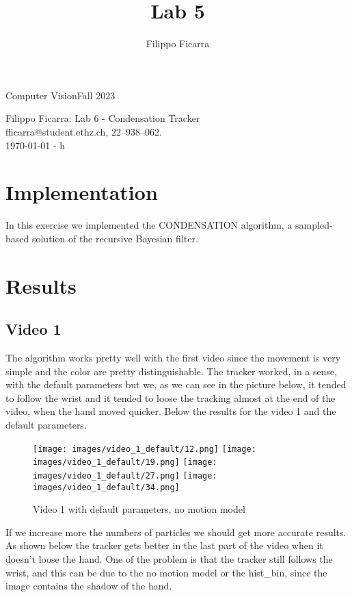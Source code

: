 \documentclass{ETHExercise}
\title{Lab 5}
\author{Filippo Ficarra}
\newcommand{\timestamp}{\ddmmyyyydate\today \,\,- \currenttime h}
\begin{document}
{}
{\Large Computer Vision}{Fall 2023}
\begin{center}
    {\Huge Filippo Ficarra: Lab 6 - Condensation Tracker}\\
      \quad\newline
      fficarra@student.ethz.ch, 22--938--062.\\
      \quad\newline
      \timestamp
      \end{center}



\section{Implementation}
In this exercise we implemented the CONDENSATION algorithm, a sampled-based solution of the recursive Bayesian filter.

\section{Results}

\subsection{Video 1}

The algorithm works pretty well with the first video since the movement 
is very simple and the color are pretty distinguishable. The tracker worked, in a sense, with the
default parameters but we, as we can see in the picture below, it tended to follow the wrist and it 
tended to loose the tracking almost at the end of the video, when the hand moved quicker.
Below the results for the video 1 and the default parameters.


\begin{figure}[!h]
    \texttt{[image: images/video\_1\_default/12.png]}
  \endminipage
    \texttt{[image: images/video\_1\_default/19.png]}
  \endminipage
    \texttt{[image: images/video\_1\_default/27.png]}
  \endminipage\space
    \texttt{[image: images/video\_1\_default/34.png]}
  \endminipage
  \caption{Video 1 with default parameters, no motion model}
\end{figure}

If we increase more the numbers of particles we should get more 
accurate results. As shown below the tracker gets better in the last part
of the video when it doesn't loose the hand. One of the problem is 
that the tracker still follows the wrist, and this can be due to the no motion
model or the hist\_bin, since the image contains the shadow of the hand. 
\end{document}
